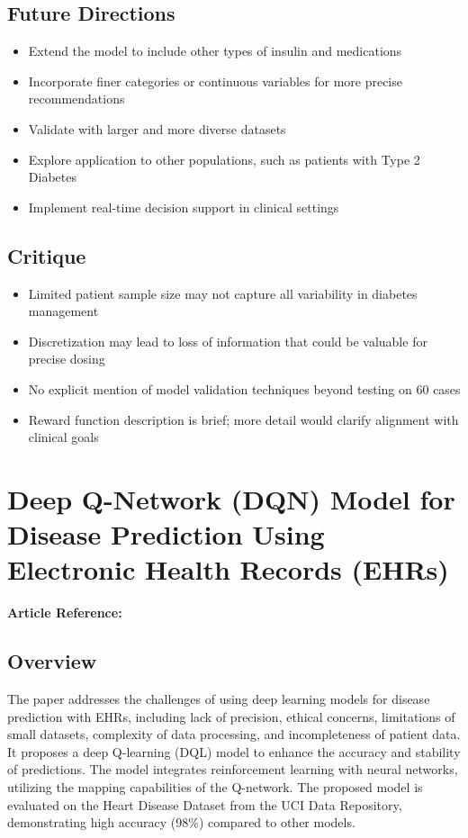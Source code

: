 \subsection*{Future Directions}
\begin{itemize}
    \item Extend the model to include other types of insulin and medications
    \item Incorporate finer categories or continuous variables for more precise recommendations
    \item Validate with larger and more diverse datasets
    \item Explore application to other populations, such as patients with Type 2 Diabetes
    \item Implement real-time decision support in clinical settings
\end{itemize}

\subsection*{Critique}
\begin{itemize}
    \item Limited patient sample size may not capture all variability in diabetes management
    \item Discretization may lead to loss of information that could be valuable for precise dosing
    \item No explicit mention of model validation techniques beyond testing on 60 cases
    \item Reward function description is brief; more detail would clarify alignment with clinical goals
\end{itemize}






\section{Deep Q-Network (DQN) Model for Disease Prediction Using Electronic Health Records (EHRs)}
\textbf{Article Reference:} \cite{abdelazizDeepQNetworkDQN2025}

\subsection*{Overview}
The paper addresses the challenges of using deep learning models for disease prediction with EHRs, including lack of precision, ethical concerns, limitations of small datasets, complexity of data processing, and incompleteness of patient data. It proposes a deep Q-learning (DQL) model to enhance the accuracy and stability of predictions. The model integrates reinforcement learning with neural networks, utilizing the mapping capabilities of the Q-network. The proposed model is evaluated on the Heart Disease Dataset from the UCI Data Repository, demonstrating high accuracy (98\%) compared to other models.

